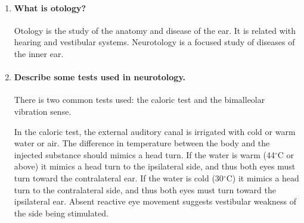\documentclass[12pt,article,oneside,a4paper]{memoir}
\begin{document}
\begin{enumerate}

\item \paragraph{What is otology?}
Otology is the study of the anatomy and disease of the ear. It is related with
hearing and vestibular systems. Neurotology is a focused study of diseases of
the inner ear.

\item \paragraph{Describe some tests used in neurotology.}
There is two common tests used: the caloric test and the bimalleolar vibration sense.

In the caloric test, the external auditory canal is irrigated with cold or warm
water or air. The difference in temperature between the body and the injected
substance should mimics a head turn. If the water is warm (44$^{\circ}$C or
above) it mimics a head turn to the ipsilateral side, and thus both eyes must
turn toward the contralateral ear. If the water is cold (30$^{\circ}$C) it
mimics a head turn to the contralateral side, and thus both eyes must turn
toward the ipsilateral ear. Absent reactive eye movement suggests vestibular
weakness of the side being stimulated.

\end{enumerate}
\end{document}
